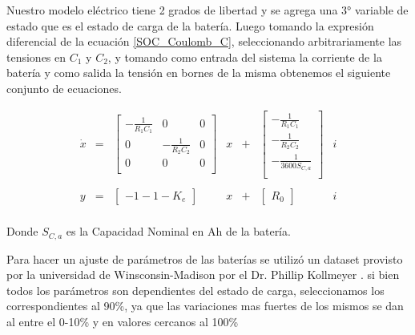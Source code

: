 \documentclass[10pt,a4paper]{article}
\begin{document}
Nuestro modelo eléctrico tiene 2 grados de libertad y se agrega una 3° variable
de estado que es el estado de carga de la batería. Luego tomando la expresión
diferencial de la ecuación \ref{SOC_Coulomb_C}, seleccionando arbitrariamente
las tensiones en $C_1$ y $C_2$, y tomando como entrada del sistema la corriente
de la batería y como salida la tensión en bornes de la misma obtenemos el
siguiente conjunto de ecuaciones.

\begin{equation}
    \begin{array}{llcllcl}
	\dot{x} & = & \begin{bmatrix}
	    -\frac{1}{R_1 C_1} &            0       & 0 \\
	    0                  & -\frac{1}{R_2 C_2} & 0 \\
	    0                  &            0       & 0 \\
	\end{bmatrix} & x & + &     \begin{bmatrix}
	    -\frac{1}{R_1 C_1} \\
	    -\frac{1}{R_2 C_2}  \\
	    -\frac{1}{3600 S_{C,a}}\\
	\end{bmatrix} & i \\
	\\
	y & = & \begin{bmatrix}
	    -1-1-K_e 
	\end{bmatrix} & x & + & \begin{bmatrix}
	    R_0
	\end{bmatrix} & i \\
    \end{array}
\end{equation}

Donde $S_{C,a}$ es la Capacidad Nominal en Ah de la batería. 

Para hacer un ajuste de parámetros de las baterías se utilizó un dataset
provisto por la universidad de Winsconsin-Madison por el Dr. Phillip Kollmeyer
\cite{Kollmeyer2018}. si bien todos los parámetros son dependientes del estado
de carga, seleccionamos los correspondientes al 90\%, ya que las variaciones mas
fuertes de los mismos se dan al entre el 0-10\% y en valores cercanos al 100\%
\end{document}
